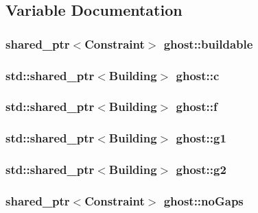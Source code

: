 \subsection{Variable Documentation}
\hypertarget{namespaceghost_aed6c0dcd76842d41ca1a81a6b4301247}{
\subsubsection[{buildable}]{\setlength{\rightskip}{0pt plus 5cm}shared\-\_\-ptr$<${\bf Constraint}$>$ ghost\-::buildable}}\label{namespaceghost_aed6c0dcd76842d41ca1a81a6b4301247}
\hypertarget{namespaceghost_a1e04a626798fce7a46db973e9693354e}{
\subsubsection[{c}]{\setlength{\rightskip}{0pt plus 5cm}std\-::shared\-\_\-ptr$<${\bf Building}$>$ ghost\-::c}}\label{namespaceghost_a1e04a626798fce7a46db973e9693354e}
\hypertarget{namespaceghost_a79c82e0d4f18942474a997e6421358f4}{
\subsubsection[{f}]{\setlength{\rightskip}{0pt plus 5cm}std\-::shared\-\_\-ptr$<${\bf Building}$>$ ghost\-::f}}\label{namespaceghost_a79c82e0d4f18942474a997e6421358f4}
\hypertarget{namespaceghost_a69c92ddb4f46d01dc2b21ff8b6c7abdd}{
\subsubsection[{g1}]{\setlength{\rightskip}{0pt plus 5cm}std\-::shared\-\_\-ptr$<${\bf Building}$>$ ghost\-::g1}}\label{namespaceghost_a69c92ddb4f46d01dc2b21ff8b6c7abdd}
\hypertarget{namespaceghost_a06d6bb1ff9795198ea63e209711cfc9e}{
\subsubsection[{g2}]{\setlength{\rightskip}{0pt plus 5cm}std\-::shared\-\_\-ptr$<${\bf Building}$>$ ghost\-::g2}}\label{namespaceghost_a06d6bb1ff9795198ea63e209711cfc9e}
\hypertarget{namespaceghost_a4b6df9d0b61991e356eb28353a73be30}{
\subsubsection[{no\-Gaps}]{\setlength{\rightskip}{0pt plus 5cm}shared\-\_\-ptr$<${\bf Constraint}$>$ ghost\-::no\-Gaps}}\label{namespaceghost_a4b6df9d0b61991e356eb28353a73be30}
